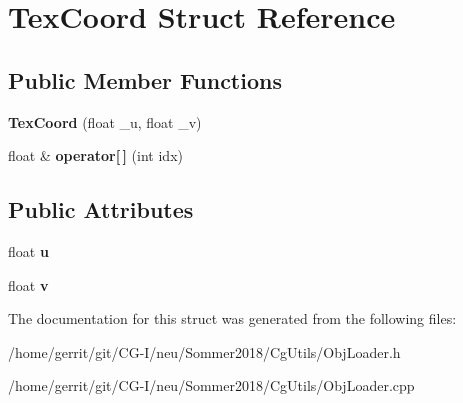 \hypertarget{struct_tex_coord}{}\section{Tex\+Coord Struct Reference}
\label{struct_tex_coord}
\subsection*{Public Member Functions}
\begin{DoxyCompactItemize}
\item 
\mbox{\label{struct_tex_coord_a70df765b54f098eb37a3b2e532bb738a}} 
{\bfseries Tex\+Coord} (float \+\_\+u, float \+\_\+v)
\item 
\mbox{\label{struct_tex_coord_a9ce349696ae666b39e6fc4262509004e}} 
float \& {\bfseries operator\mbox{[}$\,$\mbox{]}} (int idx)
\end{DoxyCompactItemize}
\subsection*{Public Attributes}
\begin{DoxyCompactItemize}
\item 
\mbox{\label{struct_tex_coord_a3be8371ac57f9ddc6ff5853e4bb58190}} 
float {\bfseries u}
\item 
\mbox{\label{struct_tex_coord_ad525bc2c53d6402267c51022db33f85e}} 
float {\bfseries v}
\end{DoxyCompactItemize}


The documentation for this struct was generated from the following files\+:\begin{DoxyCompactItemize}
\item 
/home/gerrit/git/\+C\+G-\/\+I/neu/\+Sommer2018/\+Cg\+Utils/Obj\+Loader.\+h\item 
/home/gerrit/git/\+C\+G-\/\+I/neu/\+Sommer2018/\+Cg\+Utils/Obj\+Loader.\+cpp\end{DoxyCompactItemize}
